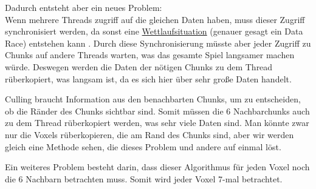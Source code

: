 \vspace{0.3cm}



\vspace{0.3cm}

Dadurch entsteht aber ein neues Problem: \\
Wenn mehrere Threads zugriff auf die gleichen Daten
haben, muss dieser Zugriff synchronisiert werden,
da sonst eine
\href{https://de.wikipedia.org/wiki/Wettlaufsituation}{Wettlaufsituation}
\cite{wiki_wettlauf} (genauer gesagt ein Data Race)
entstehen kann \cite{nomicon_races}.
Durch diese Synchronisierung müsste aber jeder Zugriff
zu Chunks auf andere Threads warten, was das gesamte
Spiel langsamer machen würde. Deswegen werden die
Daten der nötigen Chunks zu dem Thread rüberkopiert,
was langsam ist, da es sich hier über sehr große Daten
handelt.

Culling braucht Information aus den benachbarten
Chunks, um zu entscheiden, ob die Ränder des Chunks
sichtbar sind. Somit müssen die 6 Nachbarchunks
auch zu dem Thread rüberkopiert werden, was sehr viele
Daten sind. Man könnte zwar nur die Voxels
rüberkopieren, die am Rand des Chunks sind,
aber wir werden gleich eine Methode sehen,
die dieses Problem und andere auf einmal löst.

\vspace{0.3cm}

Ein weiteres Problem besteht darin, dass dieser
Algorithmus für jeden Voxel noch die 6 Nachbarn
betrachten muss. Somit wird jeder Voxel 7-mal
betrachtet.
